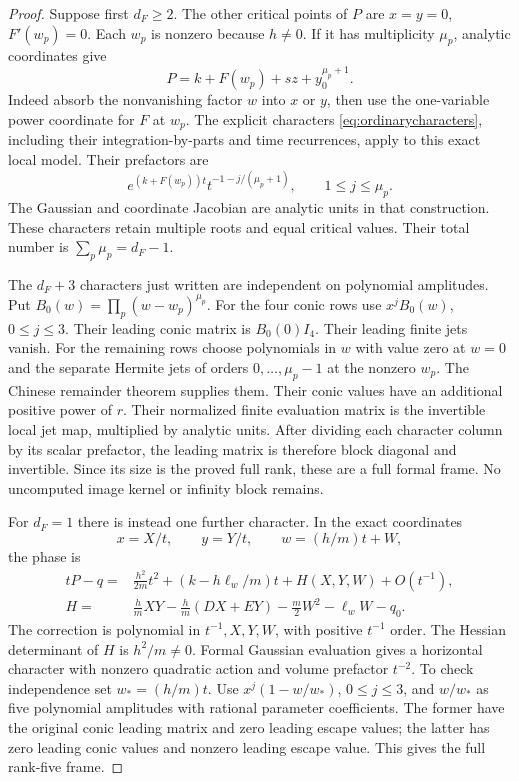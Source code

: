 \documentclass[11pt]{article}
\theoremstyle{definition}\newtheorem{definition}[theorem]{Definition}
\theoremstyle{remark}\newtheorem{remark}[theorem]{Remark}
\begin{document}
\begin{proof}
Suppose first $d_F\ge2$. The other critical points of $P$ are
$x=y=0$, $F'(w_p)=0$. Each $w_p$ is nonzero because $h\ne0$.
If it has multiplicity $\mu_p$, analytic coordinates give
\[
 P=k+F(w_p)+s z+y_0^{\mu_p+1}.
\]
Indeed absorb the nonvanishing factor $w$ into $x$ or $y$, then
use the one-variable power coordinate for $F$ at $w_p$.
The explicit characters \eqref{eq:ordinarycharacters}, including
their integration-by-parts and time recurrences, apply to this
exact local model. Their prefactors are
\[
 e^{(k+F(w_p))t}t^{-1-j/(\mu_p+1)},
                    \qquad 1\le j\le\mu_p.
\]
The Gaussian and coordinate Jacobian are analytic units in that
construction. These characters retain multiple roots and equal
critical values. Their total number is $\sum_p\mu_p=d_F-1$.

The $d_F+3$ characters just written are independent on polynomial
amplitudes. Put $B_0(w)=\prod_p(w-w_p)^{\mu_p}$. For the four
conic rows use $x^jB_0(w)$, $0\le j\le3$. Their leading
conic matrix is $B_0(0)I_4$. Their leading finite jets vanish.
For the remaining rows choose polynomials in $w$ with value zero
at $w=0$ and the separate Hermite jets of orders
$0,\ldots,\mu_p-1$ at the nonzero $w_p$. The Chinese remainder
theorem supplies them. Their conic values have an additional
positive power of $r$. Their normalized finite evaluation matrix
is the invertible local jet map, multiplied by analytic units.
After dividing each character column by its scalar prefactor,
the leading matrix is therefore block diagonal and invertible.
Since its size is the proved full rank, these are a full formal
frame. No uncomputed image kernel or infinity block remains.

For $d_F=1$ there is instead one further character. In the exact
coordinates
\[
 x=X/t,\qquad y=Y/t,\qquad w=(h/m)t+W,
\]
the phase is
\begin{align*}
 tP-q={}&\frac{h^2}{2m}t^2+(k-h\ell_w/m)t+H(X,Y,W)+O(t^{-1}),\\
 H={}&\frac hm XY-\frac hm(DX+EY)-\frac m2 W^2-\ell_w W-q_0.
\end{align*}
The correction is polynomial in $t^{-1},X,Y,W$, with positive
$t^{-1}$ order. The Hessian determinant of $H$ is $h^2/m\ne0$.
Formal Gaussian evaluation gives a horizontal character with
nonzero quadratic action and volume prefactor $t^{-2}$.
To check independence set $w_*=(h/m)t$. Use
$x^j(1-w/w_*)$, $0\le j\le3$, and $w/w_*$ as five polynomial
amplitudes with rational parameter coefficients. The former
have the original conic leading matrix and zero leading escape
values; the latter has zero leading conic values and nonzero
leading escape value. This gives the full rank-five frame.


\end{proof}
\end{document}

